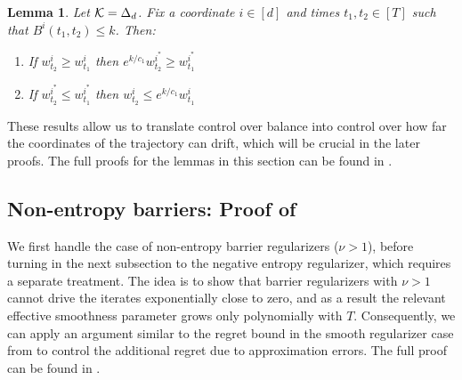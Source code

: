\documentclass[10pt]{article}
\newtheorem{lemma}[theorem]{Lemma}
\theoremstyle{definition}
\theoremstyle{remark}
\newcommand{\barconst}{\nu}
\begin{document}
\begin{lemma}\label{lem:simplex_coordinate_bounds}
Let $\mathcal K = \Delta_d$. 
Fix a coordinate $i \in [d]$ and times $t_1, t_2 \in [T]$ such that $B^i(t_1,t_2) \le k$. 
Then:
\begin{enumerate}
    \item If $w_{t_2}^i \ge w_{t_1}^i$ then $e^{k/c_1}w_{t_2}^{i^*} \ge w_{t_1}^{i^*}$
    \item If $w_{t_2}^{i^*} \le w_{t_1}^{i^*}$ then $w_{t_2}^i \le e^{k/c_1}w_{t_1}^i$
\end{enumerate}
\end{lemma}

These results allow us to translate control over balance into control over how far the coordinates of the trajectory can drift, which will be crucial in the later proofs. The full proofs for the lemmas in this section can be found in .

\subsection{Non-entropy barriers: Proof of }\label{sec:non entropy}
We first handle the case of non-entropy barrier regularizers ($\barconst > 1$), before turning in the next subsection to the negative entropy regularizer, which requires a separate treatment. The idea is to show that barrier regularizers with $\barconst > 1$ cannot drive the iterates exponentially close to zero, and 
as a result the relevant effective smoothness parameter grows only polynomially with $T$.
Consequently, we can apply an argument similar to the regret bound in the smooth regularizer case from  to control the additional regret due to approximation errors. The full proof can be found in .
\end{document}
